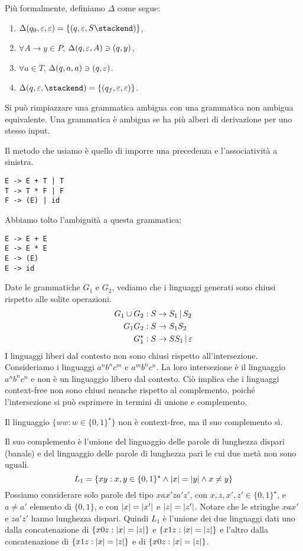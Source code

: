 Pi\`u formalmente, definiamo $\Delta$ come segue:
\begin{enumerate}
	\item $\Delta( q_0, \emptystring, \emptystring ) = \{ (q, \emptystring, S \stackend )\}$,
	\item $\forall A \to y \in P$, $\Delta (q, \varepsilon, A) \ni (q, y)$,
	\item $\forall a \in T$, $\Delta (q, a, a) \ni (q, \varepsilon)$.
	\item $\Delta (q, \emptystring, \stackend) = \{ (q_f, \emptystring, \emptystring ) \}$.
\end{enumerate}


Si pu\`o rimpiazzare una grammatica ambigua con una grammatica non ambigua equivalente.
Una grammatica \`e ambigua se ha pi\`u alberi di derivazione per uno stesso input.

Il metodo che usiamo \`e quello di imporre una precedenza e l'associativit\`a a sinistra.
\begin{verbatim}
E -> E + T | T 
T -> T * F | F
F -> (E) | id
\end{verbatim}
Abbiamo tolto l'ambiguit\`a a questa grammatica:
\begin{verbatim}
E -> E + E
E -> E * E
E -> (E)
E -> id
\end{verbatim}
Date le grammatiche $G_1$ e $G_2$, vediamo che i linguaggi generati sono chiusi rispetto alle solite operazioni.
\begin{align*}
	G_1 \cup G_2 & : S \to S_1 \, | \, S_2 \\
	G_1 G_2 & : S \to S_1 S_2 \\
	G_1^{\star} & : S \to S S_1 \, | \, \varepsilon
\end{align*}
I linguaggi liberi dal contesto non sono chiusi rispetto all'intersezione.
Consideriamo i linguaggi $a^n b^n c^m$ e $a^m b^n c^n$.
La loro intersezione \`e il linguaggio $a^n b^n c^n$ e non \`e un linguaggio libero dal contesto.
Ci\`o implica che i linguaggi context-free non sono chiusi neanche rispetto al complemento, poich\'e l'intersezione si pu\`o esprimere in termini di unione e complemento.

Il linguaggio $\{ ww : w \in \{0,1\}^{\star}\}$ non \`e context-free, ma il suo complemento s\`i.

Il suo complemento \`e l'unione del linguaggio delle parole di lunghezza dispari (banale) e del linguaggio delle parole di lunghezza pari le cui due met\`a non sono uguali.
\[
	L_1 = \{ xy : x,y \in \{0,1\}^{\star} \land \left\lvert{x}\right\rvert = \left\lvert{y}\right\rvert \land x \neq y \}
\]
Possiamo considerare solo parole del tipo $xax'za'z'$, con $x,z,x',z' \in \{0,1\}^{\star}$, e $a \neq a'$ elemento di $\{0,1\}$, e con $\left\lvert{x}\right\rvert = \left\lvert{x'}\right\rvert$ e $\left\lvert{z}\right\rvert = \left\lvert{z'}\right\rvert$.
Notare che le stringhe $xax'$ e $za'z'$ hanno lunghezza dispari.
Quindi $L_1$ \`e l'unione dei due linguaggi dati uno dalla concatenazione di $\{ x0z : \left\lvert{x}\right\rvert = \left\lvert{z}\right\rvert \}$ e $\{ x1z : \left\lvert{x}\right\rvert = \left\lvert{z}\right\rvert \}$ e l'altro dalla concatenazione di $\{ x1z : \left\lvert{x}\right\rvert = \left\lvert{z}\right\rvert \}$ e di $\{ x0z : \left\lvert{x}\right\rvert = \left\lvert{z}\right\rvert \}$.

